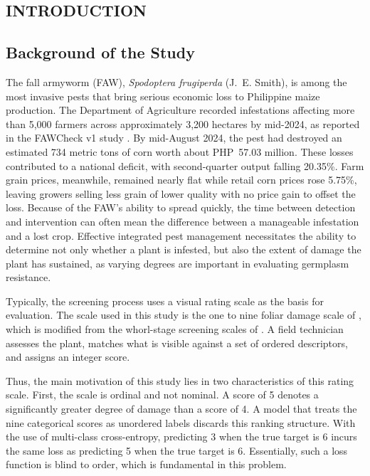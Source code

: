 \documentclass{icsthesis}
\begin{document}
	\begin{mainmatter}

		\section{INTRODUCTION}\label{sec:intro}

			\subsection{Background of the Study}\label{sec:background}

				The fall armyworm (FAW), \textit{Spodoptera frugiperda} (J.~E. Smith), is among the
				most invasive pests that bring serious economic loss to Philippine maize production.
				The Department of Agriculture recorded infestations affecting more than 5,000
				farmers across approximately 3,200 hectares by mid-2024, as reported in the FAWCheck
				v1 study \citep{casasola2026}. By mid-August 2024, the pest had destroyed an
				estimated 734 metric tons of corn worth about PHP~57.03 million. These losses
				contributed to a national deficit, with second-quarter output falling 20.35\%. Farm
				grain prices, meanwhile, remained nearly flat while retail corn prices rose 5.75\%,
				leaving growers selling less grain of lower quality with no price gain to offset the
				loss. Because of the FAW's ability to spread quickly, the time between detection and
				intervention can often mean the difference between a manageable infestation and a
				lost crop. Effective integrated pest management necessitates the ability to
				determine not only whether a plant is infested, but also the extent of damage the
				plant has sustained, as varying degrees are important in evaluating germplasm
				resistance.

				Typically, the screening process uses a visual rating scale as the basis for
				evaluation. The scale used in this study is the one to nine foliar damage scale of
				\citet{prasanna2018}, which is modified from the whorl-stage screening scales of
				\citet{davis1992}. A field technician assesses the plant, matches what is visible
				against a set of ordered descriptors, and assigns an integer score.

				Thus, the main motivation of this study lies in two characteristics of this rating
				scale. First, the scale is ordinal and not nominal. A score of 5 denotes a
				significantly greater degree of damage than a score of 4. A model that treats the
				nine categorical scores as unordered labels discards this ranking structure. With
				the use of multi-class cross-entropy, predicting 3 when the true target is 6 incurs
				the same loss as predicting 5 when the true target is 6. Essentially, such a loss
				function is blind to order, which is fundamental in this problem.


\end{mainmatter}
\end{document}
